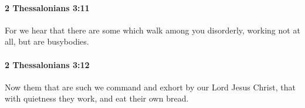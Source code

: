 		\paragraph{2 Thessalonians 3:11} %
			\label{2THESSALONIANS-3-11}

			For we hear that there are some which walk among you disorderly, working not at all, but are busybodies.

			\begin{framed}
			\scriptsize
				\begin{compactdesc}
					\item[SBLG] 
				\end{compactdesc}
			\end{framed}

		\paragraph{2 Thessalonians 3:12} %
			\label{2THESSALONIANS-3-12}

			Now them that are such we command and exhort by our Lord Jesus Christ, that with quietness they work, and eat their own bread.

